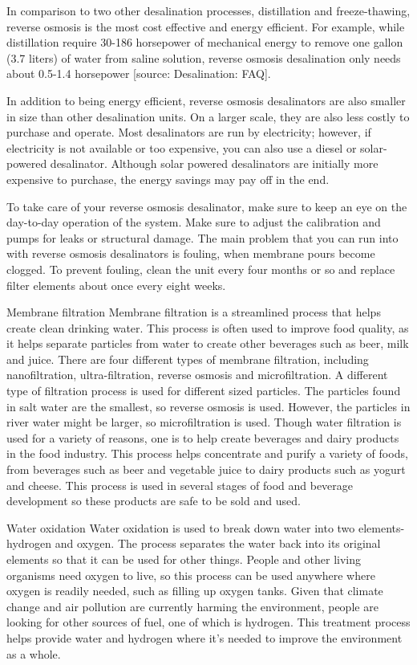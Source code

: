 In comparison to two other desalination processes, distillation and freeze-thawing, reverse osmosis is the most cost effective and energy efficient. For example, while distillation require 30-186 horsepower of mechanical energy to remove one gallon (3.7 liters) of water from saline solution, reverse osmosis desalination only needs about 0.5-1.4 horsepower [source: Desalination: FAQ].

In addition to being energy efficient, reverse osmosis desalinators are also smaller in size than other desalination units. On a larger scale, they are also less costly to purchase and operate. Most desalinators are run by electricity; however, if electricity is not available or too expensive, you can also use a diesel or solar-powered desalinator. Although solar powered desalinators are initially more expensive to purchase, the energy savings may pay off in the end.

To take care of your reverse osmosis desalinator, make sure to keep an eye on the day-to-day operation of the system. Make sure to adjust the calibration and pumps for leaks or structural damage. The main problem that you can run into with reverse osmosis desalinators is fouling, when membrane pours become clogged. To prevent fouling, clean the unit every four months or so and replace filter elements about once every eight weeks.

Membrane filtration
Membrane filtration is a streamlined process that helps create clean drinking water. This process is often used to improve food quality, as it helps separate particles from water to create other beverages such as beer, milk and juice. There are four different types of membrane filtration, including nanofiltration, ultra-filtration, reverse osmosis and microfiltration. A different type of filtration process is used for different sized particles. The particles found in salt water are the smallest, so reverse osmosis is used. However, the particles in river water might be larger, so microfiltration is used. Though water filtration is used for a variety of reasons, one is to help create beverages and dairy products in the food industry. This process helps concentrate and purify a variety of foods, from beverages such as beer and vegetable juice to dairy products such as yogurt and cheese. This process is used in several stages of food and beverage development so these products are safe to be sold and used.

Water oxidation
Water oxidation is used to break down water into two elements- hydrogen and oxygen. The process separates the water back into its original elements so that it can be used for other things. People and other living organisms need oxygen to live, so this process can be used anywhere where oxygen is readily needed, such as filling up oxygen tanks. Given that climate change and air pollution are currently harming the environment, people are looking for other sources of fuel, one of which is hydrogen. This treatment process helps provide water and hydrogen where it’s needed to improve the environment as a whole.










